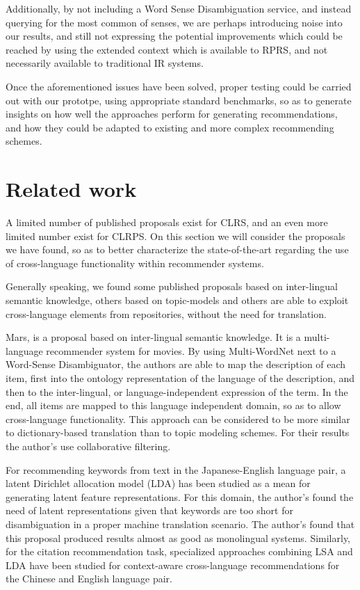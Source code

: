 \documentclass{llncs}
\begin{document}
Additionally, by not including a Word Sense Disambiguation service, and instead querying for the most common of senses, we are perhaps introducing noise into our results, and still not expressing the potential improvements which could be reached by using the extended context which is available to RPRS, and not necessarily available to traditional IR systems.

Once the aforementioned issues have been solved, proper testing could be carried out with our prototpe, using appropriate standard benchmarks, so as to generate insights on how well the approaches perform for generating recommendations, and how they could be adapted to existing and more complex recommending schemes.

\section{Related work}

A limited number of published proposals exist for CLRS, and an even more limited number exist for CLRPS. On this section we will consider the proposals we have found, so as to better characterize the state-of-the-art regarding the use of cross-language functionality within recommender systems.

Generally speaking, we found some published proposals based on inter-lingual semantic knowledge, others based on topic-models and others are able to exploit cross-language elements from repositories, without the need for translation.

Mars\cite{lops2010mars}, is a proposal based on inter-lingual semantic knowledge. It is a multi-language recommender system for movies. By using Multi-WordNet next to a Word-Sense Disambiguator, the authors are able to map the description of each item, first into the ontology representation of the language of the description, and then to the inter-lingual, or language-independent expression of the term. In the end, all items are mapped to this language independent domain, so as to allow cross-language functionality. This approach can be considered to be more similar to dictionary-based translation than to topic modeling schemes. For their results the author's use collaborative filtering. 

For recommending keywords from text in the Japanese-English language pair\cite{takasu2010cross}, a latent Dirichlet allocation model (LDA) has been studied as a mean for generating latent feature representations. For this domain, the author's found the need of latent representations given that keywords are too short for disambiguation in a proper machine translation scenario. The author's found that this proposal produced results almost as good as monolingual systems. Similarly, for the citation recommendation task, specialized approaches combining LSA and LDA have been studied for context-aware cross-language recommendations for the Chinese and English language pair\cite{tang2014cross}.
\end{document}
